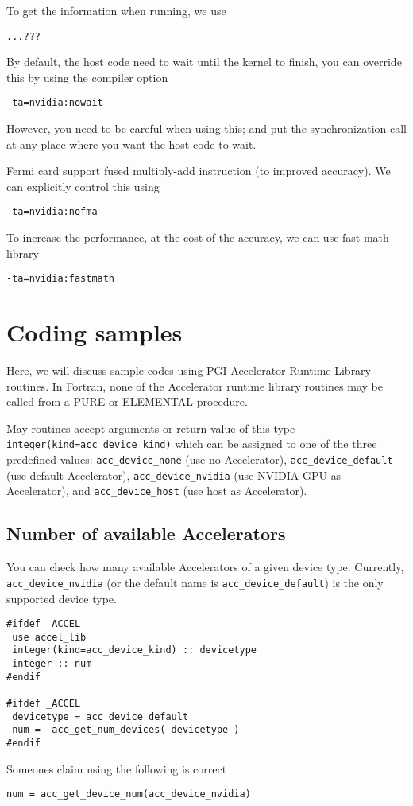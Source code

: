 To get the information when running, we use
\begin{verbatim}
...??? 
\end{verbatim}

By default, the host code need to wait until the kernel to finish, you
can override this by using the compiler option
\begin{verbatim}
-ta=nvidia:nowait
\end{verbatim}
However, you need to be careful when using this; and put the
synchronization call at any place where you want the host code to
wait. 

Fermi card support fused multiply-add instruction (to improved
accuracy). We can explicitly control this using
\begin{verbatim}
-ta=nvidia:nofma
\end{verbatim}

To increase the performance, at the cost of the accuracy, we can use
fast math library
\begin{verbatim}
-ta=nvidia:fastmath
\end{verbatim}



\section{Coding samples}
\label{sec:coding-samples}

Here, we will discuss sample codes using PGI Accelerator Runtime
Library routines. In Fortran, none of the Accelerator runtime library
routines may be called from a PURE or ELEMENTAL procedure.

May routines accept arguments or return value of this type
\verb!integer(kind=acc_device_kind)! which can be assigned to one of
the three predefined values: \verb!acc_device_none! (use no
Accelerator), \verb!acc_device_default!  (use default Accelerator),
\verb!acc_device_nvidia! (use NVIDIA GPU as Accelerator), and
\verb!acc_device_host! (use host as Accelerator).

\subsection{Number of available Accelerators}
\label{sec:numb-avail-accel}

You can check how many available Accelerators of a given device
type. Currently, \verb!acc_device_nvidia! (or the default name is
\verb!acc_device_default!) is the only supported device type.  
\begin{lstlisting}
#ifdef _ACCEL
 use accel_lib
 integer(kind=acc_device_kind) :: devicetype
 integer :: num
#endif

#ifdef _ACCEL
 devicetype = acc_device_default
 num =  acc_get_num_devices( devicetype )
#endif
\end{lstlisting}
Someones claim using the following is correct
\begin{lstlisting}
num = acc_get_device_num(acc_device_nvidia) 
\end{lstlisting}

